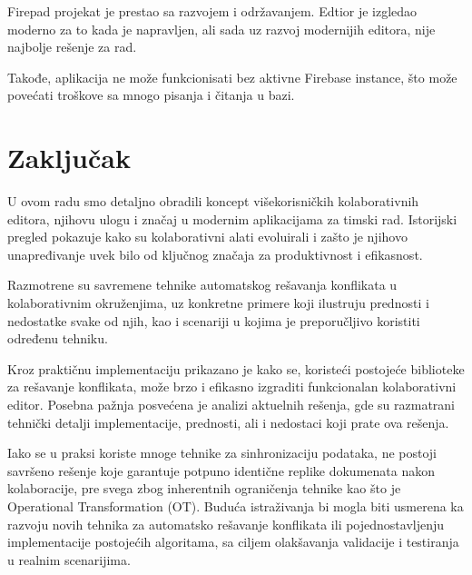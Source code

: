 \documentclass[12pt]{article}
\newcommand{\startnewsection}{
    \clearpage %
    \ifodd\value{page}\else %
        \hbox{} %
        \newpage %
    \fi
}
\begin{document}
Firepad projekat je prestao sa razvojem i održavanjem. Edtior je izgledao moderno za to kada je napravljen, ali sada uz razvoj modernijih editora, nije najbolje rešenje za rad.

Takođe, aplikacija ne može funkcionisati bez aktivne Firebase instance, što može povećati troškove sa mnogo pisanja i čitanja u bazi.


\startnewsection
\section{Zaključak}

U ovom radu smo detaljno obradili koncept višekorisničkih kolaborativnih editora, njihovu ulogu i značaj u modernim aplikacijama za timski rad. Istorijski pregled pokazuje kako su kolaborativni alati evoluirali i zašto je njihovo unapređivanje uvek bilo od ključnog značaja za produktivnost i efikasnost.

Razmotrene su savremene tehnike automatskog rešavanja konflikata u kolaborativnim okruženjima, uz konkretne primere koji ilustruju prednosti i nedostatke svake od njih, kao i scenariji u kojima je preporučljivo koristiti određenu tehniku.

Kroz praktičnu implementaciju prikazano je kako se, koristeći postojeće biblioteke za rešavanje konflikata, može brzo i efikasno izgraditi funkcionalan kolaborativni editor. Posebna pažnja posvećena je analizi aktuelnih rešenja, gde su razmatrani tehnički detalji implementacije, prednosti, ali i nedostaci koji prate ova rešenja.

Iako se u praksi koriste mnoge tehnike za sinhronizaciju podataka, ne postoji savršeno rešenje koje garantuje potpuno identične replike dokumenata nakon kolaboracije, pre svega zbog inherentnih ograničenja tehnike kao što je Operational Transformation (OT). Buduća istraživanja bi mogla biti usmerena ka razvoju novih tehnika za automatsko rešavanje konflikata ili pojednostavljenju implementacije postojećih algoritama, sa ciljem olakšavanja validacije i testiranja u realnim scenarijima.

\newpage

\printbibliography[title={Literatura}]
\end{document}
